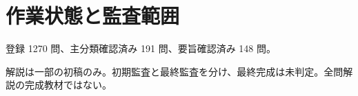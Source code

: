 \chapter{作業状態と監査範囲}
登録 1270 問、主分類確認済み 191 問、要旨確認済み 148 問。
\par 解説は一部の初稿のみ。初期監査と最終監査を分け、最終完成は未判定。全問解説の完成教材ではない。

